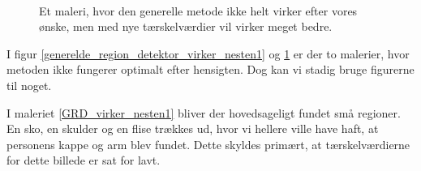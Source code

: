 \begin{figure}[!h]
    \centering
    \\
	\hspace{1em}
     \caption[]{Et maleri, hvor den generelle metode ikke helt virker efter vores ønske, men med nye tærskelværdier vil virker meget bedre.}
     \label{generelde_region_detektor_virker_nesten2}
\end{figure}

I figur \ref{generelde_region_detektor_virker_nesten1} og \ref{generelde_region_detektor_virker_nesten2} er der to
malerier, hvor metoden ikke fungerer optimalt efter hensigten. Dog kan
vi stadig bruge figurerne til noget.

I maleriet \ref{GRD_virker_nesten1} bliver der hovedsageligt fundet små
regioner. En sko, en skulder og en flise trækkes ud, hvor vi hellere
ville have haft, at personens kappe og arm blev fundet. Dette skyldes
primært, at tærskelværdierne for dette billede er sat for lavt. 


